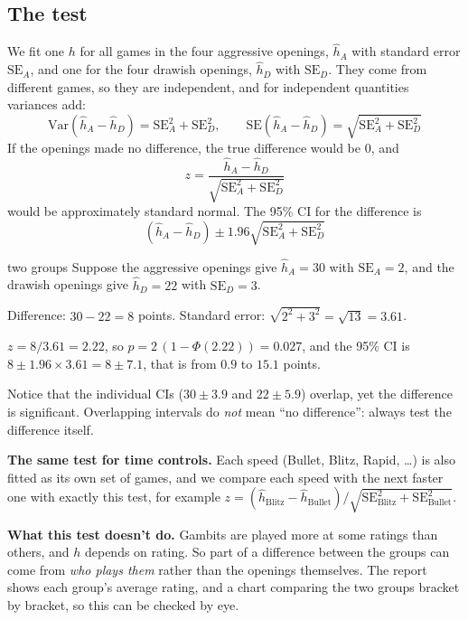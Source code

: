 \documentclass[11pt,a4paper]{article}
\begin{document}
\subsection{The test}
We fit one $h$ for all games in the four aggressive openings, $\hat h_A$ with standard error
$\mathrm{SE}_A$, and one for the four drawish openings, $\hat h_D$ with $\mathrm{SE}_D$. They come
from different games, so they are independent, and for independent quantities variances add:
\[
\mathrm{Var}(\hat h_A - \hat h_D) = \mathrm{SE}_A^2 + \mathrm{SE}_D^2,
\qquad
\mathrm{SE}(\hat h_A - \hat h_D) = \sqrt{\mathrm{SE}_A^2 + \mathrm{SE}_D^2}
\]
If the openings made no difference, the true difference would be 0, and
\[
z = \frac{\hat h_A - \hat h_D}{\sqrt{\mathrm{SE}_A^2 + \mathrm{SE}_D^2}}
\]
would be approximately standard normal. The 95\% CI for the difference is
\[
(\hat h_A - \hat h_D) \pm 1.96 \sqrt{\mathrm{SE}_A^2 + \mathrm{SE}_D^2}
\]

\begin{example}{two groups}
Suppose the aggressive openings give $\hat h_A = 30$ with $\mathrm{SE}_A = 2$, and the drawish
openings give $\hat h_D = 22$ with $\mathrm{SE}_D = 3$.

Difference: $30 - 22 = 8$ points. Standard error: $\sqrt{2^2 + 3^2} = \sqrt{13} = 3.61$.

$z = 8 / 3.61 = 2.22$, so $p = 2\,(1 - \Phi(2.22)) = 0.027$, and the 95\% CI is
$8 \pm 1.96 \times 3.61 = 8 \pm 7.1$, that is from $0.9$ to $15.1$ points.

Notice that the individual CIs ($30 \pm 3.9$ and $22 \pm 5.9$) overlap, yet the difference is
significant. Overlapping intervals do \emph{not} mean ``no difference'': always test the
difference itself.
\end{example}

\textbf{The same test for time controls.} Each speed (Bullet, Blitz, Rapid, \dots) is also
fitted as its own set of games, and we compare each speed with the next faster one with exactly
this test, for example $z = (\hat h_{\text{Blitz}} - \hat h_{\text{Bullet}}) /
\sqrt{\mathrm{SE}_{\text{Blitz}}^2 + \mathrm{SE}_{\text{Bullet}}^2}$.

\textbf{What this test doesn't do.} Gambits are played more at some ratings than others, and $h$
depends on rating. So part of a difference between the groups can come from \emph{who plays
them} rather than the openings themselves. The report shows each group's average rating, and a
chart comparing the two groups bracket by bracket, so this can be checked by eye.
\end{document}
